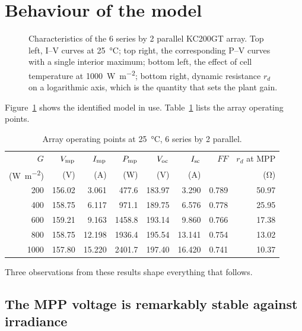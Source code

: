 \section{Behaviour of the model}

\begin{figure}[htbp]
\centering
{}
\caption[Photovoltaic array characteristics]{Characteristics of the 6 series by 2 parallel KC200GT array. Top left, I--V curves at \SI{25}{\celsius}; top right, the corresponding P--V curves with a single interior maximum; bottom left, the effect of cell temperature at \SI{1000}{\watt\per\square\metre}; bottom right, dynamic resistance $r_d$ on a logarithmic axis, which is the quantity that sets the plant gain.}
\label{fig:pvchar}
\end{figure}

Figure~\ref{fig:pvchar} shows the identified model in use.
Table~\ref{tab:pvops} lists the array operating points.

\begin{table}[htbp]
\centering
\caption{Array operating points at \SI{25}{\celsius}, 6 series by 2 parallel.}
\label{tab:pvops}
\begin{tabular}{@{}rrrrrrrr@{}}
\toprule
$G$ & $V_{\mathrm{mp}}$ & $I_{\mathrm{mp}}$ & $P_{\mathrm{mp}}$ & $V_{\mathrm{oc}}$ & $I_{\mathrm{sc}}$ & $FF$ & $r_d$ at MPP \\
(\si{\watt\per\square\metre}) & (\si{\volt}) & (\si{\ampere}) & (\si{\watt}) & (\si{\volt}) & (\si{\ampere}) & & (\si{\ohm}) \\
\midrule
200  & 156.02 & 3.061  & 477.6  & 183.97 & 3.290  & 0.789 & 50.97 \\
400  & 158.75 & 6.117  & 971.1  & 189.75 & 6.576  & 0.778 & 25.95 \\
600  & 159.21 & 9.163  & 1458.8 & 193.14 & 9.860  & 0.766 & 17.38 \\
800  & 158.75 & 12.198 & 1936.4 & 195.54 & 13.141 & 0.754 & 13.02 \\
1000 & 157.80 & 15.220 & 2401.7 & 197.40 & 16.420 & 0.741 & 10.37 \\
\bottomrule
\end{tabular}
\end{table}

Three observations from these results shape everything that follows.

\subsection{The MPP voltage is remarkably stable against irradiance}

